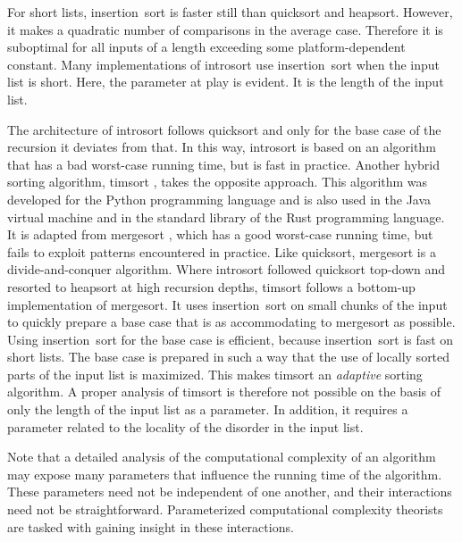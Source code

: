 \begin{example}
  For short lists, insertion~sort \parencite{cormen2009introduction} is faster still than quicksort and heapsort.
  However, it makes a quadratic number of comparisons in the average case.
  Therefore it is suboptimal for all inputs of a length exceeding some platform-dependent constant.
  Many implementations of introsort use insertion~sort when the input list is short.
  Here, the parameter at play is evident.
  It is the length of the input list.

  The architecture of introsort follows quicksort and only for the base case of the recursion it deviates from that.
  In this way, introsort is based on an algorithm that has a bad worst-case running time, but is  fast in practice.
  Another hybrid sorting algorithm, timsort \parencite{peters:timsort}, takes the opposite approach.
  This algorithm was developed for the Python programming language and is also used in the Java virtual machine and in the standard library of the Rust programming language.
  It is adapted from mergesort \parencite{cormen2009introduction}, which has a good worst-case running time, but fails to exploit patterns encountered in practice.
  Like quicksort, mergesort is a divide-and-conquer algorithm.
  Where introsort followed quicksort top-down and resorted to heapsort at high recursion depths, timsort follows a bottom-up implementation of mergesort.
  It uses insertion~sort on small chunks of the input to quickly prepare a base case that is as accommodating to mergesort as possible.
  Using insertion~sort for the base case is efficient, because insertion~sort is fast on short lists.
  The base case is prepared in such a way that the use of locally sorted parts of the input list is maximized.
  This makes timsort an \emph{adaptive} sorting algorithm.
  A proper analysis of timsort is therefore not possible on the basis of only the length of the input list as a parameter.
  In addition, it requires a parameter related to the locality of the disorder in the input list.
\end{example}

Note that a detailed analysis of the computational complexity of an algorithm may expose many parameters that influence the running time of the algorithm.
These parameters need not be independent of one another, and their interactions need not be straightforward.
Parameterized computational complexity theorists are tasked with gaining insight in these interactions.

